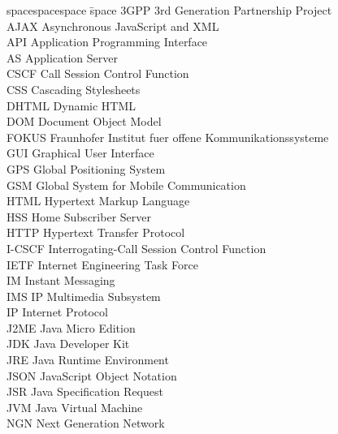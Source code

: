 
\begin{tabbing}
spacespacespace \= space \kill
3GPP	 \> 	3rd Generation Partnership Project	 \\
AJAX	\>	Asynchronous JavaScript and XML \\
API	 \> 	Application Programming Interface	 \\
AS	\>	Application Server \\
CSCF	 \> 	Call Session Control Function	 \\
CSS	\>	Cascading Stylesheets \\
DHTML	\>	Dynamic HTML \\
DOM	\>	Document Object Model \\
FOKUS	\>	Fraunhofer Institut fuer offene Kommunikationssysteme \\
GUI	\>	Graphical User Interface \\
GPS	\>	Global Positioning System \\
GSM	\>	Global System for Mobile Communication\\
HTML	\>	Hypertext Markup Language \\
HSS	 \> 	Home Subscriber Server	 \\
HTTP	 \> 	Hypertext Transfer Protocol	 \\
I-CSCF	 \> 	Interrogating-Call Session Control Function	 \\
IETF	\>	Internet Engineering Task Force \\
IM	\>	Instant Messaging \\
IMS	 \> 	IP Multimedia Subsystem	 \\
IP	 \> 	Internet Protocol	 \\
J2ME	\>	Java Micro Edition \\
JDK	\>	Java Developer Kit \\
JRE	\>	Java Runtime Environment \\
JSON	\>	JavaScript Object Notation \\
JSR	\>	Java Specification Request \\
JVM	 \> 	Java Virtual Machine	 \\
NGN	 \> 	Next Generation Network
\end{tabbing}
\endinput
